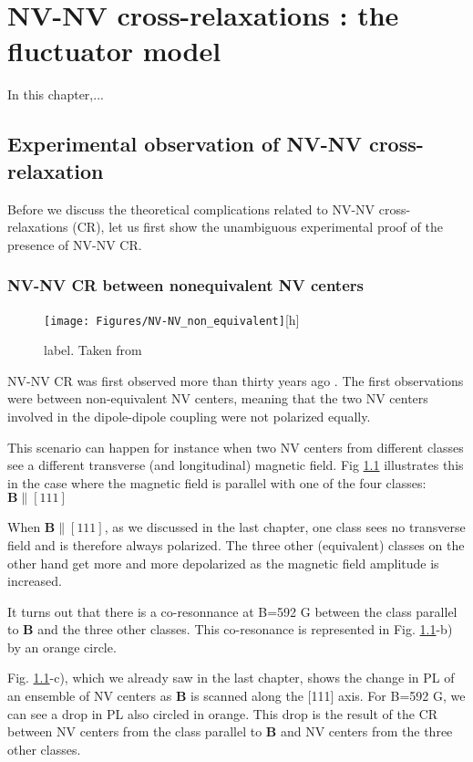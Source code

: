 \documentclass[a4paper,11pt]{report}
\title{}
\begin{document}
\chapter{NV-NV cross-relaxations : the fluctuator model}
In this chapter,...



\section{Experimental observation of NV-NV cross-relaxation}
Before we discuss the theoretical complications related to NV-NV cross-relaxations (CR), let us first show the unambiguous experimental proof of the presence of NV-NV CR.
\subsection{NV-NV CR between nonequivalent NV centers}
\begin{figure}[h]
\centering
\texttt{[image: Figures/NV-NV\_non\_equivalent]}[h]
\caption{label. Taken from \citep{armstrong2010nv}}
\label{non equivalent NV-NV}
\end{figure}
NV-NV CR was first observed more than thirty years ago \citep{holliday1989optical, van1989cross}. The first observations were between non-equivalent NV centers, meaning that the two NV centers involved in the dipole-dipole coupling were not polarized equally.

This scenario can happen for instance when two NV centers from different classes see a different transverse (and longitudinal) magnetic field. Fig \ref{non equivalent NV-NV} illustrates this in the case where the magnetic field is parallel with one of the four classes: $\mathbf{B} \parallel [111]$

When $\mathbf{B} \parallel [111]$, as we discussed in the last chapter, one class sees no transverse field and is therefore always polarized. The three other (equivalent) classes on the other hand get more and more depolarized as the magnetic field amplitude is increased. 

It turns out that there is a co-resonnance at B=592 G between the class parallel to $\mathbf{B}$ and the three other classes. This co-resonance is represented in Fig. \ref{non equivalent NV-NV}-b) by an orange circle.

Fig. \ref{non equivalent NV-NV}-c), which we already saw in the last chapter, shows the change in PL of an ensemble of NV centers as $\mathbf{B}$ is scanned along the [111] axis. For B=592 G, we can see a drop in PL also circled in orange. This drop is the result of the CR between NV centers from the class parallel to $\mathbf{B}$ and NV centers from the three other classes. 
\end{document}
